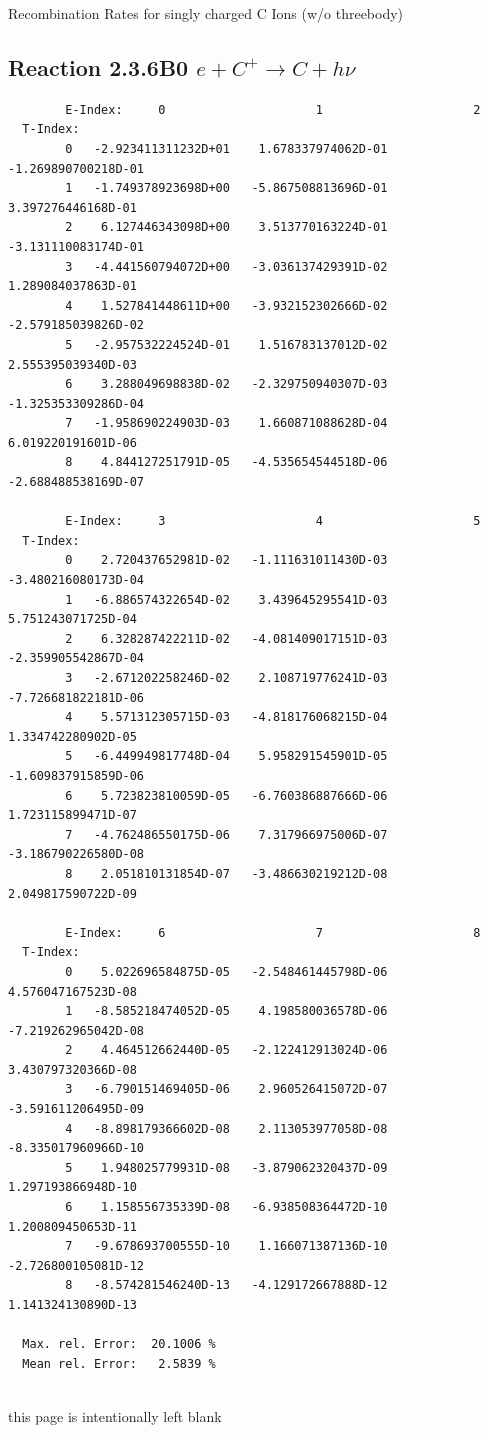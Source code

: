 \documentclass[12pt,dvips]{article}
\begin{document}
  Recombination Rates for singly charged C Ions (w/o threebody)
\subsection{
Reaction 2.3.6B0  $e + C^{+} \rightarrow C + h\nu$
}

\begin{small}\begin{verbatim}
        E-Index:     0                     1                     2
  T-Index:
        0   -2.923411311232D+01    1.678337974062D-01   -1.269890700218D-01
        1   -1.749378923698D+00   -5.867508813696D-01    3.397276446168D-01
        2    6.127446343098D+00    3.513770163224D-01   -3.131110083174D-01
        3   -4.441560794072D+00   -3.036137429391D-02    1.289084037863D-01
        4    1.527841448611D+00   -3.932152302666D-02   -2.579185039826D-02
        5   -2.957532224524D-01    1.516783137012D-02    2.555395039340D-03
        6    3.288049698838D-02   -2.329750940307D-03   -1.325353309286D-04
        7   -1.958690224903D-03    1.660871088628D-04    6.019220191601D-06
        8    4.844127251791D-05   -4.535654544518D-06   -2.688488538169D-07

        E-Index:     3                     4                     5
  T-Index:
        0    2.720437652981D-02   -1.111631011430D-03   -3.480216080173D-04
        1   -6.886574322654D-02    3.439645295541D-03    5.751243071725D-04
        2    6.328287422211D-02   -4.081409017151D-03   -2.359905542867D-04
        3   -2.671202258246D-02    2.108719776241D-03   -7.726681822181D-06
        4    5.571312305715D-03   -4.818176068215D-04    1.334742280902D-05
        5   -6.449949817748D-04    5.958291545901D-05   -1.609837915859D-06
        6    5.723823810059D-05   -6.760386887666D-06    1.723115899471D-07
        7   -4.762486550175D-06    7.317966975006D-07   -3.186790226580D-08
        8    2.051810131854D-07   -3.486630219212D-08    2.049817590722D-09

        E-Index:     6                     7                     8
  T-Index:
        0    5.022696584875D-05   -2.548461445798D-06    4.576047167523D-08
        1   -8.585218474052D-05    4.198580036578D-06   -7.219262965042D-08
        2    4.464512662440D-05   -2.122412913024D-06    3.430797320366D-08
        3   -6.790151469405D-06    2.960526415072D-07   -3.591611206495D-09
        4   -8.898179366602D-08    2.113053977058D-08   -8.335017960966D-10
        5    1.948025779931D-08   -3.879062320437D-09    1.297193866948D-10
        6    1.158556735339D-08   -6.938508364472D-10    1.200809450653D-11
        7   -9.678693700555D-10    1.166071387136D-10   -2.726800105081D-12
        8   -8.574281546240D-13   -4.129172667888D-12    1.141324130890D-13

  Max. rel. Error:  20.1006 %
  Mean rel. Error:   2.5839 %


\end{verbatim}\end{small}
\newpage
this page is intentionally left blank
\newpage
\end{document}
